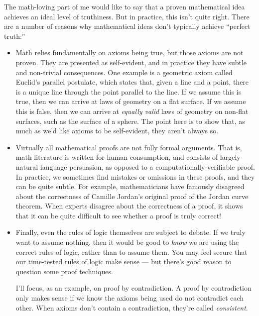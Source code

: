 \documentclass[11pt, oneside]{article}
\begin{document}
The math-loving part of me would like to say that a proven mathematical idea
achieves an ideal level of truthiness. But in practice, this isn't quite
right. There are a number of reasons why mathematical ideas don't typically
achieve ``perfect truth:''
\begin{itemize}
    \item Math relies fundamentally on axioms being true, but those axioms are
        not proven. They are presented as self-evident, and in practice they
        have subtle and non-trivial consequences.
        One example is a geometric axiom called Euclid's parallel postulate,
        which states that, given a line and a point, there is a unique line
        through the point parallel to the line. If we assume this is true, then
        we can arrive at laws of geometry on a flat surface. If we assume this
        is false, then we can arrive at {\em equally valid} laws of geometry on
        non-flat surfaces, such as the surface of a sphere. The point here is to
        show that, as much as we'd like axioms to be self-evident, they aren't
        always so.
    \item Virtually all mathematical proofs are not fully formal
        arguments. That is, math literature is written for human consumption,
        and consists of largely natural language persuasion, as opposed to a
        computationally-verifiable proof. In practice, we sometimes find
        mistakes or omissions in these proofs, and they can be quite subtle. For
        example, mathematicians have famously disagreed about the correctness of
        Camille Jordan's original proof of the Jordan curve theorem.
        When experts disagree about the correctness of a proof, it shows that it
        can be quite difficult to see whether a proof is truly correct!
    \item Finally, even the rules of logic themselves are subject to debate. If
        we truly want to assume nothing, then it would be good to {\em know} we
        are using the correct rules of logic, rather than to assume them.
        You may feel secure that our time-tested rules of logic make sense ---
        but there's good reason to question some proof techniques.

        I'll focus, as an example, on proof by contradiction.
        A proof by contradiction
        only makes sense if we know the axioms being used do not contradict each
        other.
        When axioms don't contain a contradiction, they're called {\em
        consistent}.


\end{itemize}
\end{document}
